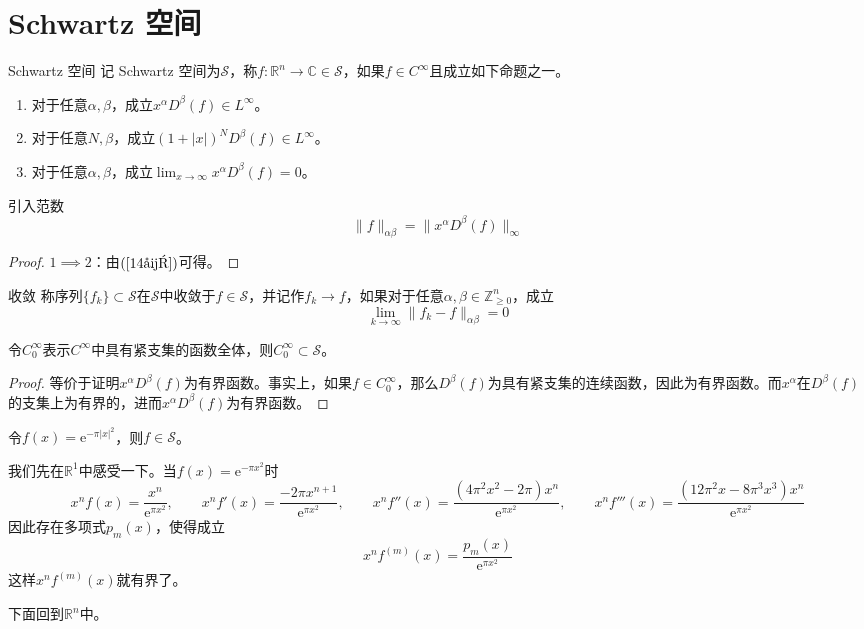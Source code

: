 \documentclass[lang = cn, %
scheme = chinese          %
]
{elegantbook}             %
\newcommand{\R}{\mathbb{R}}            %
\newcommand{\C}{\mathbb{C}}  		   %
\newcommand{\Z}{\mathbb{Z}}            %
\newcommand{\sub}{\subset}             %
\newcommand{\ee}[1]{\mathrm{e}^{#1}}           %
\newcommand{\dis}{\displaystyle}
\begin{document}
\chapter{Schwartz 空间}

\begin{definition}{Schwartz 空间}
	记 Schwartz 空间为$\mathcal{S}$，称$f:\R^n\to\C\in\mathcal{S}$，如果$f\in C^\infty$且成立如下命题之一。
	\begin{enumerate}
		\item 对于任意$\alpha,\beta$，成立$x^\alpha D^\beta(f)\in L^\infty$。
		\item 对于任意$N,\beta$，成立$(1+|x|)^N D^\beta(f)\in L^\infty$。
		\item 对于任意$\alpha,\beta$，成立$\dis\lim_{x\to\infty}x^\alpha D^\beta(f)=0$。
	\end{enumerate}
	引入范数
	\[
	\|f\|_{\alpha\beta}=\|x^\alpha D^\beta(f)\|_{\infty}
	\]
\end{definition}

\begin{proof}
	$1\implies 2$：由$(\ref{14式})$可得。
\end{proof}

\begin{definition}{收敛}
	称序列$\{ f_k \}\sub\mathcal{S}$在$\mathcal{S}$中收敛于$f\in\mathcal{S}$，并记作$f_k\to f$，如果对于任意$\alpha,\beta\in\Z_{\ge 0}^n$，成立
	\[
	\lim_{k\to\infty}\|f_k-f\|_{\alpha\beta}=0
	\]
\end{definition}

\begin{example}
	令$C_0^\infty$表示$C^\infty$中具有紧支集的函数全体，则$C_0^\infty\sub\mathcal{S}$。
\end{example}

\begin{proof}
	等价于证明$x^\alpha D^\beta(f)$为有界函数。事实上，如果$f\in C_0^\infty$，那么$D^\beta(f)$为具有紧支集的连续函数，因此为有界函数。而$x^\alpha$在$D^\beta(f)$的支集上为有界的，进而$x^\alpha D^\beta(f)$为有界函数。
\end{proof}

\begin{example}
	令$f(x)=\ee{-\pi |x|^2}$，则$f\in \mathcal{S}$。
\end{example}

\begin{note}
	我们先在$\R^1$中感受一下。当$f(x)=\ee{-\pi x^2}$时
	\[
	x^nf(x)=\frac{x^n}{\ee{\pi x^2}},\qquad
	x^nf'(x)=\frac{-2 \pi x^{n+1}}{\ee{\pi x^2}},\qquad
	x^nf''(x)=\frac{(4 \pi ^2 x^2-2 \pi) x^n}{\ee{\pi x^2}},\qquad
	x^nf'''(x)=\frac{(12 \pi^2x-8 \pi^3 x^3) x^n}{\ee{\pi x^2}}
	\]
	因此存在多项式$p_m(x)$，使得成立
	\[
	x^nf^{(m)}(x)=\frac{p_m(x)}{\ee{\pi x^2}}
	\]
	这样$x^nf^{(m)}(x)$就有界了。
	
	下面回到$\R^n$中。
\end{note}
\end{document}
